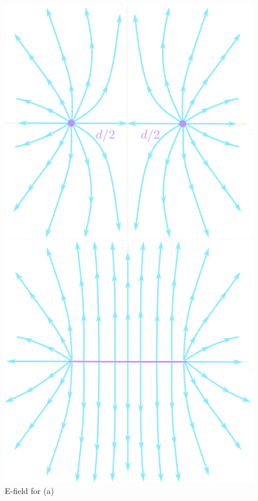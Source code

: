 \documentclass[../main.tex]{subfiles}
\begin{document}
\begin{figure}[ht]
    \centering
    \begin{minipage}[b]{0.3\linewidth}
        \centering
        \includegraphics[width=\linewidth]{images/hw2_26a.png}
        \caption{E-field for (a)}
    \end{minipage}
    \hfill
    \begin{minipage}[b]{0.3\linewidth}
        \centering
        \includegraphics[width=\linewidth]{images/hw2_26b.png}

\end{minipage}
\end{figure}
\end{document}
